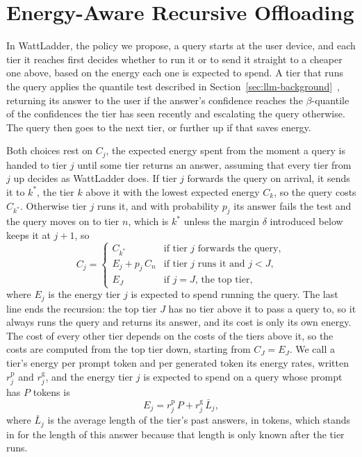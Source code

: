 \documentclass[cic,dipl,english]{infufrgs}
\begin{document}
\section{Energy-Aware Recursive Offloading}
\label{sec:policy}

In WattLadder, the policy we propose, a query starts at the user device, and each tier it reaches
first decides whether to run it or to send it straight to a cheaper one above, based on
the energy each one is expected to spend. A tier that runs the query applies the quantile
test described in Section~\ref{sec:llm-background}~\cite{wu2025recserve}, returning its
answer to the user if the answer's confidence reaches the $\beta$-quantile of the
confidences the tier has seen recently and escalating the query otherwise. The query then
goes to the next tier, or further up if that saves energy.

Both choices rest on $C_j$, the expected energy spent from the moment a query is handed
to tier $j$ until some tier returns an answer, assuming that every tier from $j$ up decides
as WattLadder does. If tier $j$ forwards the query on arrival, it sends it to
$k^*$, the tier $k$ above it with the lowest expected energy $C_k$, so the query costs
$C_{k^*}$. Otherwise tier $j$ runs
it, and with probability $p_j$ its answer fails the test and the query moves on to tier
$n$, which is $k^*$ unless the margin $\delta$ introduced below keeps it at $j+1$, so
\begin{equation}
  C_j =
  \begin{cases}
    C_{k^*} & \text{if tier } j \text{ forwards the query},\\
    E_j + p_j \, C_n & \text{if tier } j \text{ runs it and } j < J,\\
    E_J & \text{if } j = J \text{, the top tier},
  \end{cases}
  \label{eq:cost-to-completion}
\end{equation}
where $E_j$ is the energy tier $j$ is expected to spend running the query. The last line
ends the recursion: the top tier $J$ has no tier above it to pass a query to, so it always
runs the query and returns its answer, and its cost is only its own energy. The cost of
every other tier depends on the costs of the tiers above it, so the costs are computed from
the top tier down, starting from $C_J = E_J$. We call a tier's energy per prompt token and per generated token its energy
rates, written $r^{\text{p}}_j$ and $r^{\text{g}}_j$, and the energy tier $j$ is expected
to spend on a query whose prompt has $P$ tokens is
\begin{equation}
  E_j = r^{\text{p}}_j \, P + r^{\text{g}}_j \, \bar{L}_j,
  \label{eq:expected-energy}
\end{equation}
where $\bar{L}_j$ is the average length of the tier's past answers, in tokens, which stands
in for the length of this answer because that length is only known after the tier runs.
\end{document}
